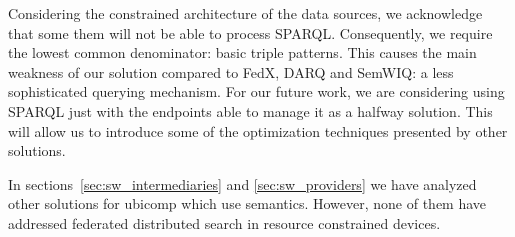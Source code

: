 Considering the constrained architecture of the data sources, we acknowledge that some them will not be able to process SPARQL.
Consequently, we require the lowest common denominator: basic triple patterns.
This causes the main weakness of our solution compared to FedX, DARQ and SemWIQ: a less sophisticated querying mechanism.
For our future work, we are considering using SPARQL just with the endpoints able to manage it as a halfway solution.
This will allow us to introduce some of the optimization techniques presented by other solutions.


\bigskip


In sections~\ref{sec:sw_intermediaries} and \ref{sec:sw_providers} we have analyzed other solutions for \ac{ubicomp} which use semantics.
However, none of them have addressed federated distributed search in resource constrained devices.












